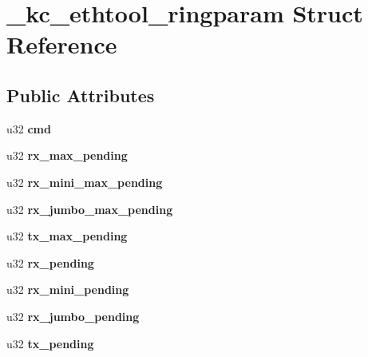 \hypertarget{struct__kc__ethtool__ringparam}{
\section{\_\-kc\_\-ethtool\_\-ringparam Struct Reference}
\label{struct__kc__ethtool__ringparam}
}
\subsection*{Public Attributes}
\begin{DoxyCompactItemize}
\item 
\hypertarget{struct__kc__ethtool__ringparam_aa35dc4be9449f0026ffcede7af71adf3}{
u32 {\bfseries cmd}}
\label{struct__kc__ethtool__ringparam_aa35dc4be9449f0026ffcede7af71adf3}

\item 
\hypertarget{struct__kc__ethtool__ringparam_a0557e651a0766f8efd76b139235abfa3}{
u32 {\bfseries rx\_\-max\_\-pending}}
\label{struct__kc__ethtool__ringparam_a0557e651a0766f8efd76b139235abfa3}

\item 
\hypertarget{struct__kc__ethtool__ringparam_a6ebfe2a673c3229f2bfd55498614c7d2}{
u32 {\bfseries rx\_\-mini\_\-max\_\-pending}}
\label{struct__kc__ethtool__ringparam_a6ebfe2a673c3229f2bfd55498614c7d2}

\item 
\hypertarget{struct__kc__ethtool__ringparam_a144916288b58a70c21ba3bdc905925f2}{
u32 {\bfseries rx\_\-jumbo\_\-max\_\-pending}}
\label{struct__kc__ethtool__ringparam_a144916288b58a70c21ba3bdc905925f2}

\item 
\hypertarget{struct__kc__ethtool__ringparam_a91a084501683e8baaacdd0141f6e5d5f}{
u32 {\bfseries tx\_\-max\_\-pending}}
\label{struct__kc__ethtool__ringparam_a91a084501683e8baaacdd0141f6e5d5f}

\item 
\hypertarget{struct__kc__ethtool__ringparam_a509b38a91c18cc3e8a221465483f7e25}{
u32 {\bfseries rx\_\-pending}}
\label{struct__kc__ethtool__ringparam_a509b38a91c18cc3e8a221465483f7e25}

\item 
\hypertarget{struct__kc__ethtool__ringparam_abf8e0ec667dd31294485cd9412c236c6}{
u32 {\bfseries rx\_\-mini\_\-pending}}
\label{struct__kc__ethtool__ringparam_abf8e0ec667dd31294485cd9412c236c6}

\item 
\hypertarget{struct__kc__ethtool__ringparam_ac39950880b3361f69cab2f7a5a35715b}{
u32 {\bfseries rx\_\-jumbo\_\-pending}}
\label{struct__kc__ethtool__ringparam_ac39950880b3361f69cab2f7a5a35715b}

\item 
\hypertarget{struct__kc__ethtool__ringparam_a6f66fdd831c7fb97cc840e6bf8f0340a}{
u32 {\bfseries tx\_\-pending}}
\label{struct__kc__ethtool__ringparam_a6f66fdd831c7fb97cc840e6bf8f0340a}

\end{DoxyCompactItemize}


